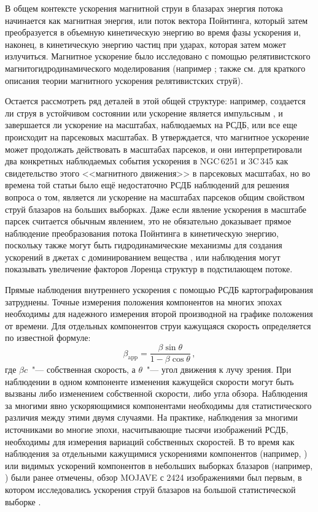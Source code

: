 В общем контексте ускорения магнитной струи в блазарах \cite{Sikora_2005} энергия потока начинается
как магнитная энергия, или поток вектора Пойнтинга, который затем преобразуется в объемную
кинетическую энергию во время фазы ускорения и, наконец, в кинетическую энергию частиц при ударах,
которая затем может излучиться. Магнитное ускорение было исследовано с помощью релятивистского
магнитогидродинамического моделирования (например \cite{McKinney_2006}; также см.
\cite{Komissarov_2011,Konigl_2010} для краткого описания теории магнитного ускорения релятивистских
струй).

Остается рассмотреть ряд деталей в этой общей структуре: например, создается ли струя в устойчивом
состоянии или ускорение является импульсным \cite{Granot_2011,Lyutikov_2010}, и
завершается ли ускорение на масштабах, наблюдаемых на РСДБ, или все еще происходит на
парсековых масштабах. В \cite{Vlahakis_2004} утверждается, что магнитное ускорение может
продолжать действовать в масштабах парсеков, и они интерпретировали два конкретных наблюдаемых
события ускорения в NGC\,6251 и 3C\,345 как свидетельство этого <<магнитного движения>> в
парсековых масштабах, но во времена той статьи было ещё недостаточно РСДБ наблюдений для
решения вопроса о том, является ли ускорение на масштабах парсеков общим свойством струй блазаров
на больших выборках. Даже если явление ускорения в масштабе парсек считается обычным явлением, это
не обязательно доказывает прямое наблюдение преобразования потока Пойнтинга в кинетическую энергию,
поскольку также могут быть гидродинамические механизмы для создания ускорений в джетах с
доминированием вещества \cite{Daly_1988,Kadler_2008}, или наблюдения могут
показывать увеличение факторов Лоренца структур в подстилающем потоке.

Прямые наблюдения внутреннего ускорения с помощью РСДБ картографирования затруднены. Точные
измерения положения компонентов на многих эпохах необходимы для надежного измерения второй
производной на графике положения от времени. Для отдельных компонентов струи кажущаяся скорость
определяется по известной формуле:
\begin{equation}
\label{speedeqn}
 \beta_\text{app} = \frac{\beta \sin\theta}{1 - \beta \cos\theta}\,,
\end{equation}
где $\beta c$~"--- собственная скорость, а $\theta$~"--- угол движения к лучу зрения. При
наблюдении в одном компоненте изменения кажущейся скорости могут быть вызваны либо изменением
собственной скорости, либо угла обзора. Наблюдения за многими явно ускоряющимися компонентами
необходимы для статистического различия между этими двумя случаями. На практике, наблюдения за
многими источниками во многие эпохи, насчитывающие тысячи изображений РСДБ, необходимы для измерения
вариаций собственных скоростей. В то время как наблюдения за отдельными кажущимися ускорениями
компонентов (например, \cite{Unwin_1997,Homan_2003}) или видимых ускорений компонентов в небольших
выборках блазаров (например, \cite{Homan_2001,Jorstad_2005}) были ранее отмечены, обзор MOJAVE с
2424 изображениями был первым, в котором исследовались ускорения струй блазаров на большой
статистической выборке \cite{Homan_2009}.

